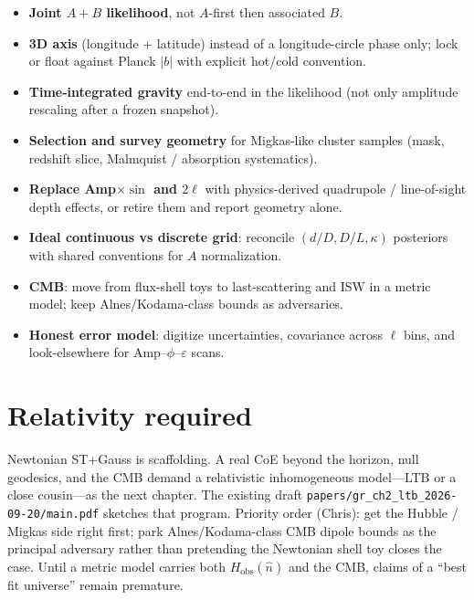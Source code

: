 \documentclass[11pt,letterpaper]{article}
\begin{document}
\begin{itemize}[leftmargin=*,itemsep=3pt]
\item \textbf{Joint $A{+}B$ likelihood}, not $A$-first then associated $B$.
\item \textbf{3D axis} (longitude + latitude) instead of a longitude-circle
  phase only; lock or float against Planck $|b|$ with explicit hot/cold
  convention.
\item \textbf{Time-integrated gravity} end-to-end in the likelihood (not only
  amplitude rescaling after a frozen snapshot).
\item \textbf{Selection and survey geometry} for Migkas-like cluster samples
  (mask, redshift slice, Malmquist / absorption systematics).
\item \textbf{Replace Amp$\times\sin$ and $2\ell$} with physics-derived
  quadrupole / line-of-sight depth effects, or retire them and report geometry
  alone.
\item \textbf{Ideal continuous vs discrete grid}: reconcile
  $(d/D,D/L,\kappa)$ posteriors with shared conventions for $A$ normalization.
\item \textbf{CMB}: move from flux-shell toys to last-scattering and ISW in a
  metric model; keep Alnes/Kodama-class bounds as adversaries.
\item \textbf{Honest error model}: digitize uncertainties, covariance across
  $\ell$ bins, and look-elsewhere for Amp--$\phi$--$\varepsilon$ scans.
\end{itemize}

\section{Relativity required}
\label{sec:GR}

Newtonian ST+Gauss is scaffolding. A real CoE beyond the horizon, null
geodesics, and the CMB demand a relativistic inhomogeneous model---LTB or a
close cousin---as the next chapter. The existing draft
\texttt{papers/gr\_ch2\_ltb\_2026-09-20/main.pdf}
sketches that program. Priority order (Chris): get the Hubble / Migkas side
right first; park Alnes/Kodama-class CMB dipole bounds as the principal
adversary rather than pretending the Newtonian shell toy closes the case.
Until a metric model carries both $H_{\mathrm{obs}}(\hat{n})$ and the CMB,
claims of a ``best fit universe'' remain premature.

\end{document}
